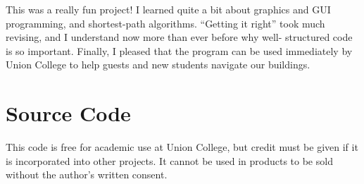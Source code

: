 \documentclass[12pt,letterpaper,titlepage]{article}   %
\begin{document}
This was a really fun project! I learned quite a bit about graphics and
GUI programming, and shortest-path algorithms. ``Getting it right'' took
much revising, and I understand now more than ever before why well-
structured code is so important. Finally, I pleased that the program can
be used immediately by Union College to help guests and new students
navigate our buildings.


\pagestyle{plain} %


\nocite{*}

\newpage
\pagestyle{fancy} %
\appendix
\section{Source Code}

This code is free for academic use at Union College, but credit must be
given if it is incorporated into other projects. It cannot be used in
products to be sold without the author's written consent.
\end{document}
